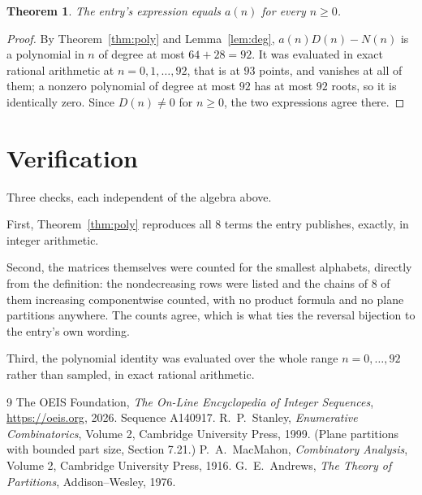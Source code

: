 \documentclass[11pt,a4paper]{article}
\theoremstyle{plain}
\newtheorem{theorem}{Theorem}
\theoremstyle{definition}
\begin{document}
\begin{theorem}
The entry's expression equals $a(n)$ for every $n\ge0$.
\end{theorem}

\begin{proof}
By Theorem~\ref{thm:poly} and Lemma~\ref{lem:deg}, $a(n)D(n)-N(n)$ is a polynomial in $n$
of degree at most $64+28=92$. It was evaluated in exact rational arithmetic at
$n=0,1,\dots,92$, that is at $93$ points, and vanishes at all of them; a nonzero polynomial
of degree at most $92$ has at most $92$ roots, so it is identically zero. Since $D(n)\neq0$
for $n\ge0$, the two expressions agree there.
\end{proof}

\section{Verification}

Three checks, each independent of the algebra above.

First, Theorem~\ref{thm:poly} reproduces all $8$ terms the entry publishes,
exactly, in integer arithmetic.

Second, the matrices themselves were counted for the smallest alphabets, directly from the
definition: the nondecreasing rows were listed and the chains of $8$ of them increasing
componentwise counted, with no product formula and no plane partitions anywhere. The counts
agree, which is what ties the reversal bijection to the entry's own wording.

Third, the polynomial identity was evaluated over the whole range $n=0,\dots,92$ rather than
sampled, in exact rational arithmetic.

\begin{thebibliography}{9}
 The OEIS Foundation, \emph{The On-Line Encyclopedia of Integer
Sequences}, \url{https://oeis.org}, 2026. Sequence A140917.
 R.~P.~Stanley, \emph{Enumerative Combinatorics}, Volume 2, Cambridge
University Press, 1999. (Plane partitions with bounded part size, Section 7.21.)
 P.~A.~MacMahon, \emph{Combinatory Analysis}, Volume 2, Cambridge
University Press, 1916.
 G.~E.~Andrews, \emph{The Theory of Partitions}, Addison--Wesley, 1976.
\end{thebibliography}
\end{document}
